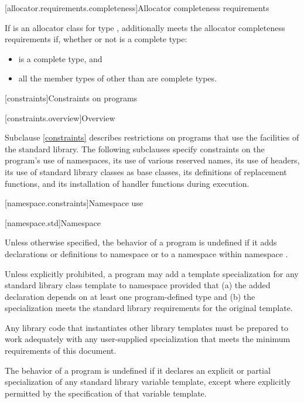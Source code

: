 [allocator.requirements.completeness]{Allocator completeness requirements}

\pnum
If  is an allocator class for type ,
 additionally meets the allocator completeness requirements if,
whether or not  is a complete type:
\begin{itemize}
\item {} is a complete type, and
\item all the member types of 
  other than  are complete types.
\end{itemize}

[constraints]{Constraints on programs}

[constraints.overview]{Overview}

\pnum
Subclause \ref{constraints} describes restrictions on \Cpp{} programs that use the facilities of
the \Cpp{} standard library. The following subclauses specify constraints on the
program's use of namespaces, its use of various reserved
names, its use of headers, its use of
standard library classes as base classes, its
definitions of replacement functions, and its
installation of handler functions during execution.

[namespace.constraints]{Namespace use}

[namespace.std]{Namespace }

\pnum
Unless otherwise specified,
the behavior of a \Cpp{} program is undefined if it adds declarations or definitions to namespace
or to a namespace within namespace
.

\pnum
Unless explicitly prohibited,
a program may add a template specialization for
any standard library class template
to namespace
 provided that
(a) the added declaration
depends on at least one program-defined type
and
(b) the specialization meets the standard library requirements
for the original template.
\begin{footnote}
Any
library code that instantiates other library templates
must be prepared to work adequately with any user-supplied specialization
that meets the minimum requirements of this document.
\end{footnote}

\pnum
The behavior of a \Cpp{} program is undefined
if it declares an explicit or partial specialization
of any standard library variable template,
except where explicitly permitted by the specification of that variable template.

